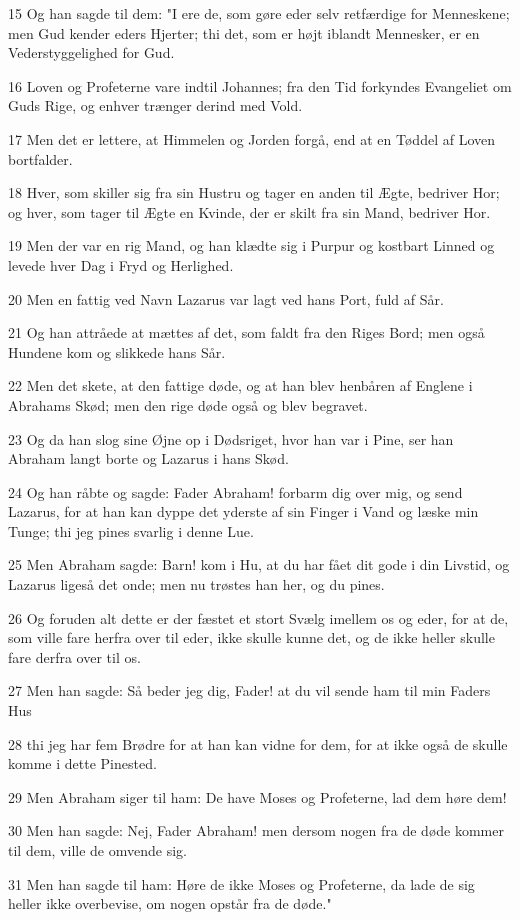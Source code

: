 \par 15 Og han sagde til dem: "I ere de, som gøre eder selv retfærdige for Menneskene; men Gud kender eders Hjerter; thi det, som er højt iblandt Mennesker, er en Vederstyggelighed for Gud.
\par 16 Loven og Profeterne vare indtil Johannes; fra den Tid forkyndes Evangeliet om Guds Rige, og enhver trænger derind med Vold.
\par 17 Men det er lettere, at Himmelen og Jorden forgå, end at en Tøddel af Loven bortfalder.
\par 18 Hver, som skiller sig fra sin Hustru og tager en anden til Ægte, bedriver Hor; og hver, som tager til Ægte en Kvinde, der er skilt fra sin Mand, bedriver Hor.
\par 19 Men der var en rig Mand, og han klædte sig i Purpur og kostbart Linned og levede hver Dag i Fryd og Herlighed.
\par 20 Men en fattig ved Navn Lazarus var lagt ved hans Port, fuld af Sår.
\par 21 Og han attråede at mættes af det, som faldt fra den Riges Bord; men også Hundene kom og slikkede hans Sår.
\par 22 Men det skete, at den fattige døde, og at han blev henbåren af Englene i Abrahams Skød; men den rige døde også og blev begravet.
\par 23 Og da han slog sine Øjne op i Dødsriget, hvor han var i Pine, ser han Abraham langt borte og Lazarus i hans Skød.
\par 24 Og han råbte og sagde: Fader Abraham! forbarm dig over mig, og send Lazarus, for at han kan dyppe det yderste af sin Finger i Vand og læske min Tunge; thi jeg pines svarlig i denne Lue.
\par 25 Men Abraham sagde: Barn! kom i Hu, at du har fået dit gode i din Livstid, og Lazarus ligeså det onde; men nu trøstes han her, og du pines.
\par 26 Og foruden alt dette er der fæstet et stort Svælg imellem os og eder, for at de, som ville fare herfra over til eder, ikke skulle kunne det, og de ikke heller skulle fare derfra over til os.
\par 27 Men han sagde: Så beder jeg dig, Fader! at du vil sende ham til min Faders Hus
\par 28 thi jeg har fem Brødre for at han kan vidne for dem, for at ikke også de skulle komme i dette Pinested.
\par 29 Men Abraham siger til ham: De have Moses og Profeterne, lad dem høre dem!
\par 30 Men han sagde: Nej, Fader Abraham! men dersom nogen fra de døde kommer til dem, ville de omvende sig.
\par 31 Men han sagde til ham: Høre de ikke Moses og Profeterne, da lade de sig heller ikke overbevise, om nogen opstår fra de døde."

